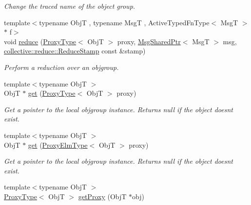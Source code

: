 \begin{DoxyCompactItemize}
\begin{DoxyCompactList}\small\item\em Change the traced name of the object group. \end{DoxyCompactList}\item 
{\footnotesize template$<$typename ObjT , typename MsgT , Active\+Typed\+Fn\+Type$<$ Msg\+T $>$ $\ast$ f$>$ }\\void \hyperlink{structvt_1_1objgroup_1_1_obj_group_manager_ae794f79a67e0a916b175ab9853185339}{reduce} (\hyperlink{structvt_1_1objgroup_1_1_obj_group_manager_aea65eef52f240a52210132eef5ce591f}{Proxy\+Type}$<$ ObjT $>$ proxy, \hyperlink{namespacevt_ab2b3d506ec8e8d1540aede826d84a239}{Msg\+Shared\+Ptr}$<$ MsgT $>$ msg, \hyperlink{namespacevt_1_1collective_1_1reduce_a7b7cb3021ac5654d92825d9fab0250b2}{collective\+::reduce\+::\+Reduce\+Stamp} const \&stamp)
\begin{DoxyCompactList}\small\item\em Perform a reduction over an objgroup. \end{DoxyCompactList}\item 
{\footnotesize template$<$typename ObjT $>$ }\\ObjT $\ast$ \hyperlink{structvt_1_1objgroup_1_1_obj_group_manager_a4b11402fc31ca40e1dd2eacb65101e2b}{get} (\hyperlink{structvt_1_1objgroup_1_1_obj_group_manager_aea65eef52f240a52210132eef5ce591f}{Proxy\+Type}$<$ ObjT $>$ proxy)
\begin{DoxyCompactList}\small\item\em Get a pointer to the local objgroup instance. Returns null if the object doesn\textquotesingle{}t exist. \end{DoxyCompactList}\item 
{\footnotesize template$<$typename ObjT $>$ }\\ObjT $\ast$ \hyperlink{structvt_1_1objgroup_1_1_obj_group_manager_a70e5e1d0ada31d6f88a8ec88965df895}{get} (\hyperlink{structvt_1_1objgroup_1_1_obj_group_manager_adba6c8ecb0f4c30e719f1abb995cfc9b}{Proxy\+Elm\+Type}$<$ ObjT $>$ proxy)
\begin{DoxyCompactList}\small\item\em Get a pointer to the local objgroup instance. Returns null if the object doesn\textquotesingle{}t exist. \end{DoxyCompactList}\item 
{\footnotesize template$<$typename ObjT $>$ }\\\hyperlink{structvt_1_1objgroup_1_1_obj_group_manager_aea65eef52f240a52210132eef5ce591f}{Proxy\+Type}$<$ ObjT $>$ \hyperlink{structvt_1_1objgroup_1_1_obj_group_manager_a9758d68a4656e7ff2eb1ac07b4feeeed}{get\+Proxy} (ObjT $\ast$obj)

\end{DoxyCompactItemize}
